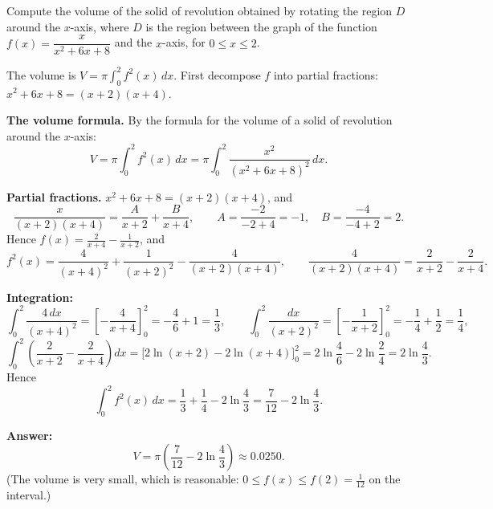 
\begin{question}
Compute the volume of the solid of revolution obtained by rotating the region $D$ around the $x$-axis, where $D$ is the region between the graph of the function $f(x)=\dfrac{x}{x^2+6x+8}$ and the $x$-axis, for $0\le x\le2$.
\end{question}

\begin{hint}
The volume is $V=\pi\int_0^2f^2(x)\,dx$. First decompose $f$ into partial fractions: $x^2+6x+8=(x+2)(x+4)$.
\end{hint}

\begin{solution}
\textbf{The volume formula.} By the formula for the volume of a solid of revolution around the $x$-axis:
\[
V=\pi\int_0^2 f^2(x)\,dx=\pi\int_0^2\frac{x^2}{(x^2+6x+8)^2}\,dx.
\]

\textbf{Partial fractions.} $x^2+6x+8=(x+2)(x+4)$, and
\[
\frac{x}{(x+2)(x+4)}=\frac{A}{x+2}+\frac{B}{x+4},\qquad A=\frac{-2}{-2+4}=-1,\quad B=\frac{-4}{-4+2}=2.
\]
Hence $f(x)=\frac{2}{x+4}-\frac{1}{x+2}$, and
\[
f^2(x)=\frac{4}{(x+4)^2}+\frac{1}{(x+2)^2}-\frac{4}{(x+2)(x+4)},\qquad
\frac{4}{(x+2)(x+4)}=\frac{2}{x+2}-\frac{2}{x+4}.
\]

\textbf{Integration:}
\[
\int_0^2\frac{4\,dx}{(x+4)^2}=\left[-\frac4{x+4}\right]_0^2=-\frac46+1=\frac13,\qquad
\int_0^2\frac{dx}{(x+2)^2}=\left[-\frac1{x+2}\right]_0^2=-\frac14+\frac12=\frac14,
\]
\[
\int_0^2\left(\frac{2}{x+2}-\frac{2}{x+4}\right)dx=\Big[2\ln(x+2)-2\ln(x+4)\Big]_0^2=2\ln\frac46-2\ln\frac24=2\ln\frac43.
\]
Hence
\[
\int_0^2f^2(x)\,dx=\frac13+\frac14-2\ln\frac43=\frac7{12}-2\ln\frac43.
\]

\textbf{Answer:}
\[
V=\pi\left(\frac{7}{12}-2\ln\frac43\right)\approx0.0250.
\]
(The volume is very small, which is reasonable: $0\le f(x)\le f(2)=\frac1{12}$ on the interval.)
\end{solution}
